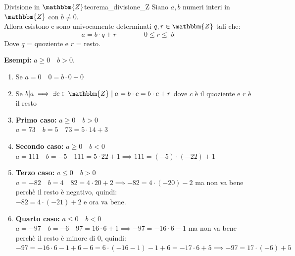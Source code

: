 \documentclass[12pt, letterpaper]{report}
\newcounter{theorem}
\newcommand{\nmu}{}
\begin{document}
		\begin{theorem}{\nmu Divisione in $\mathbbm{Z}$}{teorema_divisione_Z}
			Siano $a,b$ numeri interi in $\mathbbm{Z}$ con $b \neq 0$. \\
			Allora esistono e sono univocamente determinati $q,r \in \mathbbm{Z}$ tali che: \[a = b \cdot q + r \qquad \qquad 0 \leq r \leq |b|\]
			Dove $q$ = quoziente e $r$ = resto.
		\end{theorem}
		\textbf{Esempi: }$a \geq 0 \quad b > 0$.
		\begin{enumerate}
			\item Se $a = 0 \quad 0 = b \cdot 0 + 0$
			\item Se $b|a \implies \exists c \in \mathbbm{Z} \mid a = b \cdot c = b \cdot c + r$ dove $c$ è il quoziente e $r$ è il resto
			\item \textbf{Primo caso: } $a \geq 0 \quad b > 0$ \\
			$a = 73 \quad b = 5 \quad 73 = 5 \cdot 14 + 3$
			\item \textbf{Secondo caso: } $a \geq 0 \quad b < 0$ \\
			$a = 111 \quad b = -5 \quad 111 = 5 \cdot 22 + 1 \implies 111 = (-5) \cdot (-22) + 1$
			\item \textbf{Terzo caso: } $a \leq 0 \quad b > 0$ \\
			$a = -82 \quad b = 4 \quad 82 = 4 \cdot 20 + 2 \implies -82 = 4 \cdot (-20) - 2$ ma non va bene perchè il resto è negativo, quindi: \\
			$-82 = 4 \cdot (-21) + 2$ e ora va bene.
			\item \textbf{Quarto caso:} $a \leq 0 \quad b < 0$ \\
			$a = -97 \quad b = -6 \quad 97 = 16 \cdot 6 + 1 \implies -97 = -16 \cdot 6 - 1$ ma non va bene perchè il resto è minore di 0, quindi: \\
			$-97 = -16 \cdot 6 -1 + 6 - 6 = 6 \cdot (-16 - 1) -1 + 6 = -17 \cdot 6 + 5 \implies -97 = 17 \cdot (-6) + 5$
		\end{enumerate}
\end{document}
